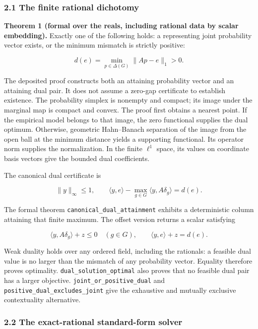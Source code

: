 \documentclass[
  10pt,
]{article}
\begin{document}
\subsubsection{2.1 The finite rational dichotomy}\label{the-finite-rational-dichotomy}

\textbf{Theorem 1 (formal over the reals, including rational data by scalar embedding).} Exactly one of the following holds: a representing joint probability vector exists, or the minimum mismatch is strictly positive:

\protect\hypertarget{math-E0009-0010}{}{\[
d(e)=\min_{p\in\Delta(G)}\lVert Ap-e\rVert_1>0.
\]}

The deposited proof constructs both an attaining probability vector and an attaining dual pair. It does not assume a zero-gap certificate to establish existence. The probability simplex is nonempty and compact; its image under the marginal map is compact and convex. The proof first obtains a nearest point. If the empirical model belongs to that image, the zero functional supplies the dual optimum. Otherwise, geometric Hahn--Banach separation of the image from the open ball at the minimum distance yields a supporting functional. Its operator norm supplies the normalization. In the finite \protect\hypertarget{math-E0022-0011}{}{\(\ell^1\)} space, its values on coordinate basis vectors give the bounded dual coefficients.

The canonical dual certificate is

\protect\hypertarget{math-E0010-0012}{}{\[
\lVert y\rVert_\infty\leq 1,\qquad
\langle y,e\rangle-\max_{g\in G}\langle y,A\delta_g\rangle=d(e).
\]}

The formal theorem \texttt{canonical\_dual\_attainment} exhibits a deterministic column attaining that finite maximum. The offset version returns a scalar satisfying

\protect\hypertarget{math-E0020-0013}{}{\[
\langle y,A\delta_g\rangle+z\leq0\quad(g\in G),\qquad
\langle y,e\rangle+z=d(e).
\]}

Weak duality holds over any ordered field, including the rationals: a feasible dual value is no larger than the mismatch of any probability vector. Equality therefore proves optimality. \texttt{dual\_solution\_optimal} also proves that no feasible dual pair has a larger objective. \texttt{joint\_or\_positive\_dual} and \texttt{positive\_dual\_excludes\_joint} give the exhaustive and mutually exclusive contextuality alternative.

\subsubsection{2.2 The exact-rational standard-form solver}\label{the-exact-rational-standard-form-solver}
\end{document}
